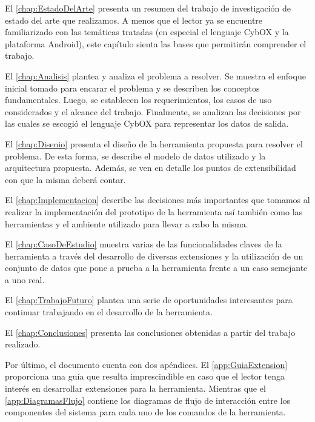 El \autoref{chap:EstadoDelArte} presenta un resumen del trabajo de investigación de estado del arte que realizamos. A menos que el lector ya se encuentre familiarizado con las temáticas tratadas (en especial el lenguaje CybOX y la plataforma Android), este capítulo sienta las bases que permitirán comprender el trabajo.

El \autoref{chap:Analisis} plantea y analiza el problema a resolver. Se muestra el enfoque inicial tomado para encarar el problema y se describen los conceptos fundamentales. Luego, se establecen los requerimientos, los casos de uso considerados y el alcance del trabajo. Finalmente, se analizan las decisiones por las cuales se escogió el lenguaje CybOX para representar los datos de salida.

El \autoref{chap:Disenio} presenta el diseño de la herramienta propuesta para resolver el problema. De esta forma, se describe el modelo de datos utilizado y la arquitectura propuesta. Además, se ven en detalle los puntos de extensibilidad con que la misma deberá contar.

El \autoref{chap:Implementacion} describe las decisiones más importantes que tomamos al realizar la implementación del prototipo de la herramienta así también como las herramientas y el ambiente utilizado para llevar a cabo la misma.

El \autoref{chap:CasoDeEstudio} muestra varias de las funcionalidades claves de la herramienta a través del desarrollo de diversas extensiones y la utilización de un conjunto de datos que pone a prueba a la herramienta frente a un caso semejante a uno real.

El \autoref{chap:TrabajoFuturo} plantea una serie de oportunidades interesantes para continuar trabajando en el desarrollo de la herramienta.

El \autoref{chap:Conclusiones} presenta las conclusiones obtenidas a partir del trabajo realizado.

Por último, el documento cuenta con dos apéndices. El \autoref{app:GuiaExtension} proporciona una guía que resulta imprescindible en caso que el lector tenga interés en desarrollar extensiones para la herramienta. Mientras que el \autoref{app:DiagramasFlujo} contiene los diagramas de flujo de interacción entre los componentes del sistema para cada uno de los comandos de la herramienta.